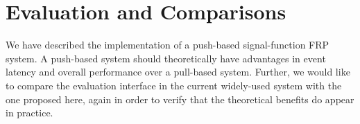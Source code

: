 \chapter{Evaluation and Comparisons}
\label{chapter:Evaluation_and_Comparisons}

We have described the implementation of a push-based signal-function FRP system.
A push-based system should theoretically have advantages in event latency and
overall performance over a pull-based system. Further, we would like to compare
the evaluation interface in the current widely-used system with the one proposed
here, again in order to verify that the theoretical benefits do appear in
practice.